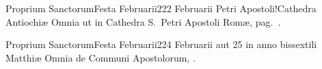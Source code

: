 \documentclass[psalterium-dominicis.tex]{subfiles}
\begin{document}
	{Proprium Sanctorum}{Festa Februarii}{2}{22 Februarii}
	{}{}{Petri Apostoli!Cathedra Antiochiæ}
	{Omnia ut in Cathedra S.\ Petri Apostoli Romæ, pag.\ \pageref{M-0118}.}
	{}

	{Proprium Sanctorum}{Festa Februarii}{2}{24 Februarii aut 25 in anno bissextili}
	{}{}{Matthiæ}
	{Omnia de Communi Apostolorum, \pageref{M-APEX}.}
	{}
\end{document}
